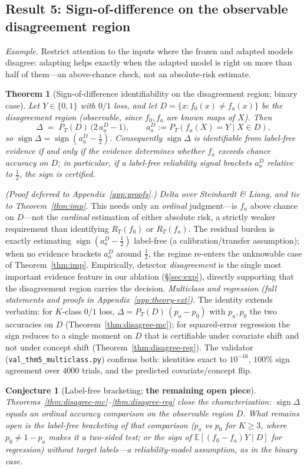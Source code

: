 \documentclass[11pt]{article}
\theoremstyle{plain}
\newtheorem{theorem}{Theorem}
\newtheorem{conjecture}{Conjecture}
\theoremstyle{definition}
\newcommand{\E}{\mathbb{E}}
\newcommand{\sign}{\operatorname{sign}}
\begin{document}
\subsection{Result 5: Sign-of-difference on the observable disagreement region}\label{sec:disagree}
\noindent\emph{Example.} Restrict attention to the inputs where the frozen and adapted models
disagree: adapting helps exactly when the adapted model is right on more than half of them---an
above-chance check, not an absolute-risk estimate.
\begin{theorem}[Sign-of-difference identifiability on the disagreement region; binary case]\label{thm:disagree}
Let $Y\in\{0,1\}$ with $0/1$ loss, and let $D=\{x: f_0(x)\neq f_a(x)\}$ be the
\emph{disagreement region} (observable, since $f_0,f_a$ are known maps of $X$). Then
\[
\Delta \;=\; P_T(D)\,\bigl(2\,a_a^D-1\bigr),\qquad a_a^D:=P_T\!\left(f_a(X)=Y \mid X\in D\right),
\]
so $\sign\Delta=\sign\!\left(a_a^D-\tfrac12\right)$. Consequently $\sign\Delta$ is
identifiable from label-free evidence \emph{if and only if} the evidence determines
whether $f_a$ exceeds chance accuracy on $D$; in particular, if a label-free
reliability signal brackets $a_a^D$ relative to $\tfrac12$, the sign is certified.
\end{theorem}
\emph{(Proof deferred to Appendix~\ref{app:proofs}.)}
\noindent\emph{Delta over Steinhardt \& Liang, and tie to Theorem~\ref{thm:imp}.}
This needs only an \emph{ordinal} judgment---is $f_a$ above chance on $D$---not the
\emph{cardinal} estimation of either absolute risk, a strictly weaker requirement than
identifying $R_T(f_0)$ or $R_T(f_a)$. The residual burden is exactly estimating
$\sign(a_a^D-\tfrac12)$ label-free (a calibration/transfer assumption); when no
evidence brackets $a_a^D$ around $\tfrac12$, the regime re-enters the unknowable case
of Theorem~\ref{thm:imp}. Empirically, detector \emph{disagreement} is the single most
important evidence feature in our ablation (\S\ref{sec:exp}), directly supporting that
the disagreement region carries the decision.
\noindent\emph{Multiclass and regression (full statements and proofs in
Appendix~\ref{app:theory-ext}).} The identity extends verbatim: for $K$-class $0/1$
loss, $\Delta=P_T(D)\,(p_a-p_0)$ with $p_a,p_0$ the two accuracies on $D$
(Theorem~\ref{thm:disagree-mc}); for squared-error regression the sign reduces to a
single moment on $D$ that is certifiable under covariate shift and not under concept
shift (Theorem~\ref{thm:disagree-reg}). The validator
(\texttt{val\_thm5\_multiclass.py}) confirms both: identities exact to $10^{-16}$,
$100\%$ sign agreement over $4000$ trials, and the predicted covariate/concept flip.
\begin{conjecture}[Label-free bracketing; \textbf{the remaining open piece}]\label{conj:gen}
Theorems~\ref{thm:disagree-mc}--\ref{thm:disagree-reg} \emph{close the characterization}:
$\sign\Delta$ equals an ordinal accuracy comparison on the observable region $D$. What
remains open is the label-free \emph{bracketing} of that comparison ($p_a$ vs $p_0$ for
$K\ge3$, where $p_0\neq1-p_a$ makes it a two-sided test; or the sign of
$\E[(f_0-f_a)Y\mid D]$ for regression) without target labels---a reliability-model
assumption, as in the binary case.
\end{conjecture}
\end{document}
